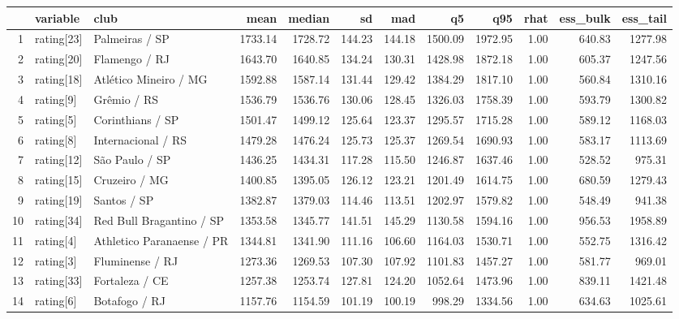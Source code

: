\begin{table}[ht]
\centering
\begin{tabular}{rllrrrrrrrrr}
  \hline
 & variable & club & mean & median & sd & mad & q5 & q95 & rhat & ess\_bulk & ess\_tail \\ 
  \hline
1 & rating[23] & Palmeiras / SP & 1733.14 & 1728.72 & 144.23 & 144.18 & 1500.09 & 1972.95 & 1.00 & 640.83 & 1277.98 \\ 
  2 & rating[20] & Flamengo / RJ & 1643.70 & 1640.85 & 134.24 & 130.31 & 1428.98 & 1872.18 & 1.00 & 605.37 & 1247.56 \\ 
  3 & rating[18] & Atlético Mineiro / MG & 1592.88 & 1587.14 & 131.44 & 129.42 & 1384.29 & 1817.10 & 1.00 & 560.84 & 1310.16 \\ 
  4 & rating[9] & Grêmio / RS & 1536.79 & 1536.76 & 130.06 & 128.45 & 1326.03 & 1758.39 & 1.00 & 593.79 & 1300.82 \\ 
  5 & rating[5] & Corinthians / SP & 1501.47 & 1499.12 & 125.64 & 123.37 & 1295.57 & 1715.28 & 1.00 & 589.12 & 1168.03 \\ 
  6 & rating[8] & Internacional / RS & 1479.28 & 1476.24 & 125.73 & 125.37 & 1269.54 & 1690.93 & 1.00 & 583.17 & 1113.69 \\ 
  7 & rating[12] & São Paulo / SP & 1436.25 & 1434.31 & 117.28 & 115.50 & 1246.87 & 1637.46 & 1.00 & 528.52 & 975.31 \\ 
  8 & rating[15] & Cruzeiro / MG & 1400.85 & 1395.05 & 126.12 & 123.21 & 1201.49 & 1614.75 & 1.00 & 680.59 & 1279.43 \\ 
  9 & rating[19] & Santos / SP & 1382.87 & 1379.03 & 114.46 & 113.51 & 1202.97 & 1579.82 & 1.00 & 548.49 & 941.38 \\ 
  10 & rating[34] & Red Bull Bragantino / SP & 1353.58 & 1345.77 & 141.51 & 145.29 & 1130.58 & 1594.16 & 1.00 & 956.53 & 1958.89 \\ 
  11 & rating[4] & Athletico Paranaense / PR & 1344.81 & 1341.90 & 111.16 & 106.60 & 1164.03 & 1530.71 & 1.00 & 552.75 & 1316.42 \\ 
  12 & rating[3] & Fluminense / RJ & 1273.36 & 1269.53 & 107.30 & 107.92 & 1101.83 & 1457.27 & 1.00 & 581.77 & 969.01 \\ 
  13 & rating[33] & Fortaleza / CE & 1257.38 & 1253.74 & 127.81 & 124.20 & 1052.64 & 1473.96 & 1.00 & 839.11 & 1421.48 \\ 
  14 & rating[6] & Botafogo / RJ & 1157.76 & 1154.59 & 101.19 & 100.19 & 998.29 & 1334.56 & 1.00 & 634.63 & 1025.61 \\ 

\end{tabular}
\end{table}
